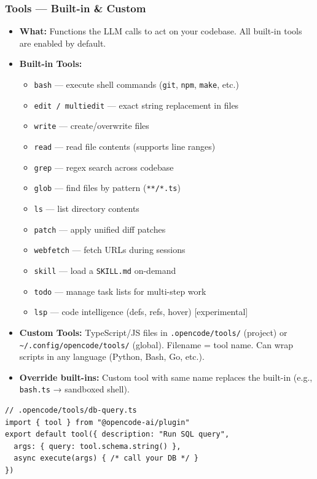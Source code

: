 \begin{frame}[fragile]\frametitle{Tools — Built-in \& Custom}
  \begin{itemize}
    \item \textbf{What:} Functions the LLM calls to act on your codebase. All built-in tools are enabled by default.
    \item \textbf{Built-in Tools:}
      \begin{itemize}
        \item \texttt{bash} — execute shell commands (\texttt{git}, \texttt{npm}, \texttt{make}, etc.)
        \item \texttt{edit / multiedit} — exact string replacement in files
        \item \texttt{write} — create/overwrite files
        \item \texttt{read} — read file contents (supports line ranges)
        \item \texttt{grep} — regex search across codebase
        \item \texttt{glob} — find files by pattern (\texttt{**/*.ts})
        \item \texttt{ls} — list directory contents
        \item \texttt{patch} — apply unified diff patches
        \item \texttt{webfetch} — fetch URLs during sessions
        \item \texttt{skill} — load a \texttt{SKILL.md} on-demand
        \item \texttt{todo} — manage task lists for multi-step work
        \item \texttt{lsp} — code intelligence (defs, refs, hover) [experimental]
      \end{itemize}
    \item \textbf{Custom Tools:} TypeScript/JS files in \texttt{.opencode/tools/} (project) or \texttt{\textasciitilde/.config/opencode/tools/} (global). Filename = tool name. Can wrap scripts in any language (Python, Bash, Go, etc.).
    \item \textbf{Override built-ins:} Custom tool with same name replaces the built-in (e.g., \texttt{bash.ts} → sandboxed shell).
  \end{itemize}
  
\begin{lstlisting}
// .opencode/tools/db-query.ts
import { tool } from "@opencode-ai/plugin"
export default tool({ description: "Run SQL query",
  args: { query: tool.schema.string() },
  async execute(args) { /* call your DB */ }
})
\end{lstlisting}  
\end{frame}


